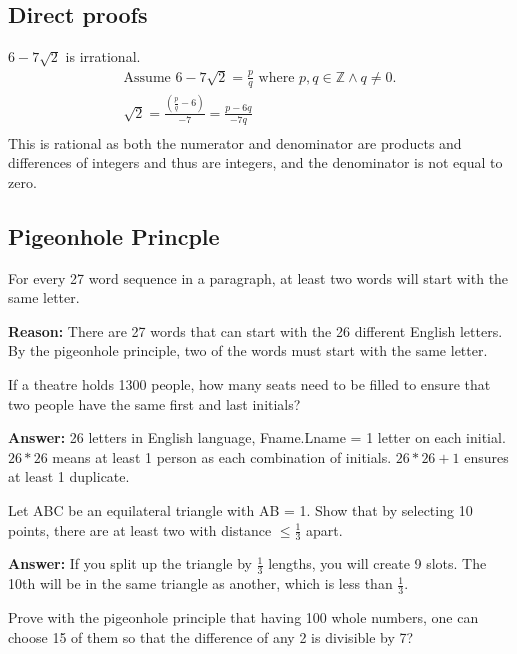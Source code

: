 \documentclass[landscape, letterpaper, 8pt]{extarticle}
\begin{document}
\begin{multicols}{3}
    \subsection*{Direct proofs}
    \begin{example}
        $6-7\sqrt{2}$ is irrational.
        \begin{align*}
            \text{Assume } 6-7\sqrt{2} = \frac{p}{q} \text{ where } p, q \in \mathbb{Z} \land q \not = 0. \\
            \sqrt{2} = \frac{\left(\frac{p}{q}-6\right)}{-7} = \frac{p-6q}{-7q}                           \\
        \end{align*}
        This is rational as both the numerator and denominator are products and differences of integers and thus are integers, and the denominator is not equal to zero.
    \end{example}
    \subsection*{Pigeonhole Princple}
    \begin{example}
        For every 27 word sequence in a paragraph, at least two words will start with the same letter.

        \textbf{Reason: } There are 27 words that can start with the 26 different English letters. By the pigeonhole principle, two of the words must start with the same letter.
    \end{example}
    \begin{example}
        If a theatre holds 1300 people, how many seats need to be filled to ensure that two people have the same first and last initials?

        \textbf{Answer: } 26 letters in English language, Fname.Lname = 1 letter on each initial. $26 * 26$ means at least 1 person as each combination of initials. $26 * 26 +1$ ensures at least 1 duplicate.
    \end{example}
    \begin{example}
        Let ABC be an equilateral triangle with AB = 1. Show that by selecting 10 points, there are at least two with distance $\leq \frac{1}{3}$ apart.

        \textbf{Answer: } If you split up the triangle by $\frac{1}{3}$ lengths, you will create 9 slots. The 10th will be in the same triangle as another, which is less than $\frac{1}{3}$.
    \end{example}
    \begin{example}
        Prove with the pigeonhole principle that having 100 whole numbers, one can choose 15 of them so that the difference of any 2 is divisible by 7?


\end{example}
\end{multicols}
\end{document}
